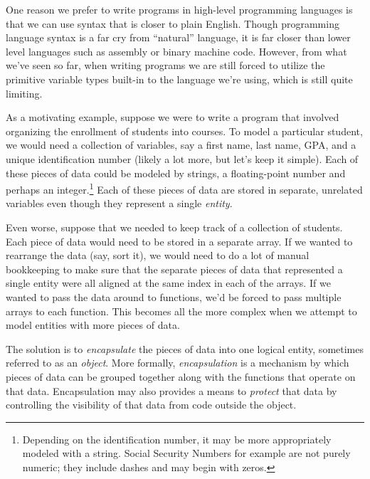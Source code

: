 

One reason we prefer to write programs in high-level programming
languages is that we can use syntax that is closer 
to plain English.  Though programming language syntax is a far cry 
from ``natural'' language, it is far closer than lower level 
languages such as assembly or binary machine code.  However, from
what we've seen so far, when writing programs we are still forced
to utilize the primitive variable types built-in to the language
we're using, which is still quite limiting.

As a motivating example, suppose we were to write a program that
involved organizing the enrollment of students into courses.  To
model a particular student, we would need a collection of variables, 
say a first name, last name, GPA, and a unique identification number
(likely a lot more, but let's keep it simple).  Each of these
pieces of data could be modeled by strings, a floating-point number
and perhaps an integer.\footnote{Depending on the identification
number, it may be more appropriately modeled with a string.  Social
Security Numbers for example are not purely numeric; they include
dashes and may begin with zeros.}  Each of these pieces of 
data are stored in separate, unrelated variables even though they
represent a single \emph{entity}.  

Even worse, suppose that we needed to keep track of a collection
of students.  Each piece of data would need to be stored in 
a separate array.  If we wanted to rearrange the data (say, sort
it), we would need to do a lot of manual bookkeeping to make sure
that the separate pieces of data that represented a single entity
were all aligned at the same index in each of the arrays.  If we
wanted to pass the data around to functions, we'd be forced to
pass multiple arrays to each function.  This becomes all the more
complex when we attempt to model entities with more pieces of 
data.  

The solution is to 
\emph{encapsulate} the pieces of data into
one logical entity, sometimes referred to as an 
\emph{object}.  
More formally, \emph{encapsulation} is a mechanism by which
pieces of data can be grouped together along with the functions
that operate on that data.  Encapsulation may also provides a 
means to \emph{protect} that data by controlling the 
visibility of that data from code outside the object.

